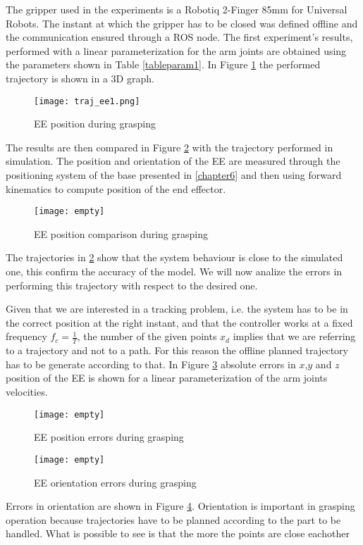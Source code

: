 	 The gripper used in the experiments is a Robotiq 2-Finger 85mm for Universal Robots. The instant at which the gripper has to be closed was defined offline and the communication ensured through a ROS node. The first experiment's results, performed with a linear parameterization for the arm joints are obtained using the parameters shown in Table \ref{tableparam1}. 
	In Figure \ref{traj_ee1} the performed trajectory is shown in a 3D graph. 
	\begin{figure}[h!]
	\centering
	\texttt{[image: traj\_ee1.png]}
	\caption{EE position during grasping}
	\label{traj_ee1}
	\end{figure}

	The results are then compared in Figure \ref{traj_ee1_comp} with the trajectory performed in simulation. The position and orientation of the EE are measured through the positioning system of the base presented in \ref{chapter6} and then using forward kinematics to compute position of the end effector. 

	\begin{figure}[h!]
	\centering
	\texttt{[image: empty]}
	\caption{EE position comparison during grasping}
	\label{traj_ee1_comp}
	\end{figure}
	The trajectories in \ref{traj_ee1_comp} show that the system behaviour is close to the simulated one, this confirm the accuracy of the model. We will now analize the errors in performing this trajectory with respect to the desired one.  

	Given that we are interested in a tracking problem, i.e. the system has to be in the correct position at the right instant, and that the controller works at a fixed frequency $f_c=\frac{1}{T}$, the number of the given points $x_d$ implies that we are referring to a trajectory and not to a path. For this reason the offline planned trajectory has to be generate according to that. 
	In Figure \ref{error_xyz1} absolute errors in $x$,$y$ and $z$ position of the EE is shown for a linear parameterization of the arm joints velocities.

	\begin{figure}[h!]
	\centering
	\texttt{[image: empty]}
	\caption{EE position errors during grasping}
	\label{error_xyz1}
	\end{figure}
	\begin{figure}[h!]
	\centering
	\texttt{[image: empty]}
	\caption{EE orientation errors during grasping}
	\label{error_orient1}
	\end{figure}

	Errors in orientation are shown in Figure \ref{error_orient1}. Orientation is important in grasping operation because trajectories have to be planned according to the part to be handled. What is possible to see is that the more the points are close eachother  


